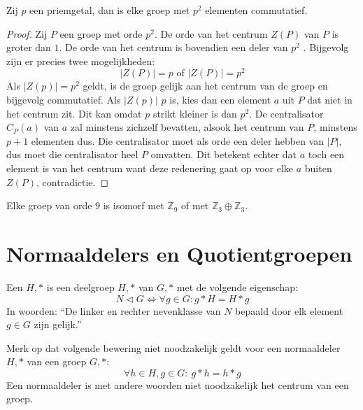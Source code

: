 \documentclass[main.tex]{subfiles}
\begin{document}
\begin{st}
  \label{st:priemgroep-kwadraat-abels}
  Zij $p$ een priemgetal, dan is elke groep met $p^{2}$ elementen commutatief.

  \begin{proof}
    Zij $P$ een groep met orde $p^{2}$.
    De orde van het centrum $Z(P)$ van $P$ is groter dan $1$.
    De orde van het centrum is bovendien een deler van $p^{2}$ .
    Bijgevolg zijn er precies twee mogelijkheden:
    \[ |Z(P)| = p \text { of } |Z(P)| = p^{2} \]
    Als $|Z(p)| = p^{2}$ geldt, is de groep gelijk aan het centrum van de groep en bijgevolg commutatief.
    Als $|Z(p)|$ $p$ is, kies dan een element $a$ uit $P$ dat niet in het centrum zit. Dit kan omdat $p$ strikt kleiner is dan $p^{2}$.
    De centralisator $C_{P}(a)$ van $a$ zal minstens zichzelf bevatten, alsook het centrum van $P$, minstens $p+1$ elementen dus.
    Die centralisator moet als orde een deler hebben van $|P|$,  dus moet die centralisator heel $P$ omvatten.
    Dit betekent echter dat $a$ toch een element is van het centrum want deze redenering gaat op voor elke $a$ buiten $Z(P)$, contradictie. 
  \end{proof}
\end{st}

\begin{st}
  Elke groep van orde $9$ is isomorf met $\mathbb{Z}_{9}$ of met $\mathbb{Z}_{3} \oplus \mathbb{Z}_{3}$.
  
\end{st}

\section{Normaaldelers en Quotientgroepen}
\label{sec:normaaldelers-en-quotientgroepen}

\begin{de}
  Een  $H,*$ is een deelgroep $H,*$ van $G,*$ met de volgende eigenschap:
  \[ N \triangleleft G \Leftrightarrow \forall g \in G: g*H = H*g \]
  In woorden: ``De linker en rechter nevenklasse van $N$ bepaald door elk element $g\in G$ zijn gelijk.''
\end{de}

\begin{opm}
  Merk op dat volgende bewering niet noodzakelijk geldt voor een normaaldeler $H,*$ van een groep $G,*$:
  \[ \forall h \in H, g \in G:\ g*h = h*g \]
  Een normaaldeler is met andere woorden niet noodzakelijk het centrum van een groep.
\end{opm}
\end{document}
